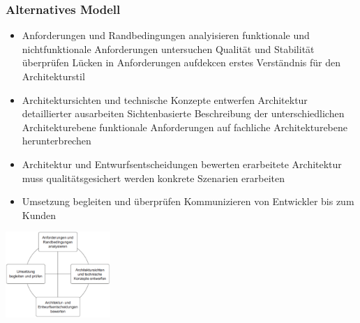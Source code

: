 \documentclass{report}
\newenvironment{Figure}
	{\par\medskip\noindent\minipage{\linewidth}}
	{\endminipage\par\medskip}
\theoremstyle{definition}
\theoremstyle{example}
\begin{document}
\subsubsection{Alternatives Modell}
\begin{itemize}
   \item Anforderungen und Randbedingungen analyisieren
   \subitem funktionale und nichtfunktionale Anforderungen untersuchen
   \subitem Qualität und Stabilität überprüfen
   \subitem Lücken in Anforderungen aufdekcen
   \subitem erstes Verständnis für den Architekturstil
   \item Architektursichten und technische Konzepte entwerfen
   \subitem Architektur detaillierter ausarbeiten
   \subitem Sichtenbasierte Beschreibung der unterschiedlichen Architekturebene
   \subitem funktionale Anforderungen auf fachliche Architekturebene herunterbrechen
   \item Architektur und Entwurfsentscheidungen bewerten
   \subitem erarbeitete Architektur muss qualitätsgesichert werden
   \subitem konkrete Szenarien erarbeiten
   \item Umsetzung begleiten und überprüfen
   \subitem Kommunizieren von Entwickler bis zum Kunden 
\end{itemize}

\begin{Figure}
   \centering
    \includegraphics[width=150px]{img/AlternativesModell.png}
        \label{fig:Ablauf des alternativen Modells}
\end{Figure}
\end{document}
